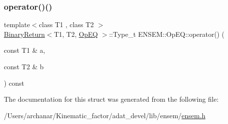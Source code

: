 \mbox{\label{structENSEM_1_1OpEQ_a91c7b46e62390256d4a5a7bad129f9b5}} 
\subsubsection{\texorpdfstring{operator()()}{operator()()}\hspace{0.1cm}{\footnotesize\ttfamily [2/2]}}
{\footnotesize\ttfamily template$<$class T1 , class T2 $>$ \\
\mbox{\hyperlink{structENSEM_1_1BinaryReturn}{Binary\+Return}}$<$T1, T2, \mbox{\hyperlink{structENSEM_1_1OpEQ}{Op\+EQ}} $>$\+::Type\+\_\+t E\+N\+S\+E\+M\+::\+Op\+E\+Q\+::operator() (\begin{DoxyParamCaption}\item[{const T1 \&}]{a,  }\item[{const T2 \&}]{b }\end{DoxyParamCaption}) const\hspace{0.3cm}{\ttfamily [inline]}}



The documentation for this struct was generated from the following file\+:\begin{DoxyCompactItemize}
\item 
/\+Users/archanar/\+Kinematic\+\_\+factor/adat\+\_\+devel/lib/ensem/\mbox{\hyperlink{lib_2ensem_2ensem_8h}{ensem.\+h}}\end{DoxyCompactItemize}
